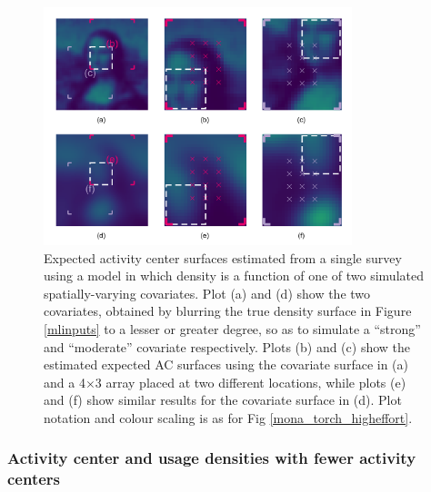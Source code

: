 \documentclass[useAMS,usenatbib,referee]{biom}
\begin{document}
\begin{figure}[htbp]
\centering
\includegraphics[width=0.8\textwidth]{mona_covariates.png}
\caption{Expected activity center surfaces estimated from a single survey using a model in which density is a function of one of two simulated spatially-varying covariates. Plot (a) and (d) show the two covariates, obtained by blurring the true density surface in Figure \ref{mlinputs} to a lesser or greater degree, so as to simulate a ``strong'' and ``moderate'' covariate respectively. Plots (b) and (c) show the estimated expected AC surfaces using the covariate surface in (a) and a 4$\times$3 array placed at two different locations, while plots (e) and (f) show similar results for the covariate surface in (d). Plot notation and colour scaling is as for Fig \ref{mona_torch_higheffort}.} 
\label{mona_covariates}
\end{figure}

\subsubsection{Activity center and usage densities with fewer activity centers}
\end{document}
